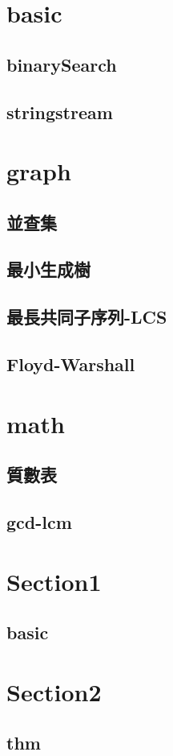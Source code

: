 \section{basic}
    \subsection{binarySearch}
        
    \subsection{stringstream}
        
\section{graph}
    \subsection{並查集}
        
    \subsection{最小生成樹}
        
    \subsection{最長共同子序列-LCS}
        
    \subsection{Floyd-Warshall}
        
\section{math}
    \subsection{質數表}
        
    \subsection{gcd-lcm}
        

\section{Section1}
    \subsection{basic}
        

\section{Section2}
    \subsection{thm}
        